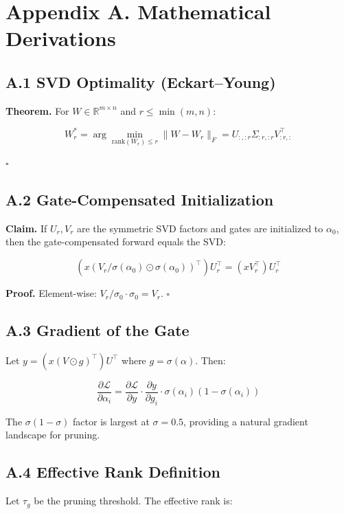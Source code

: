 
\section{Appendix A. Mathematical Derivations}

\subsection{A.1 SVD Optimality (Eckart--Young)}

\textbf{Theorem.} For $W \in \mathbb{R}^{m \times n}$ and $r \leq \min(m, n)$:

\[
W_r^* = \arg\min_{\text{rank}(W_r) \leq r} \|W - W_r\|_F = U_{:, :r} \Sigma_{:r, :r} V_{:r, :}^\top
\tag{A.1}
\]

$\square$

\subsection{A.2 Gate-Compensated Initialization}

\textbf{Claim.} If $U_r, V_r$ are the symmetric SVD factors and gates are 
initialized to $\alpha_0$, then the gate-compensated forward equals the SVD:

\[
(x (V_r / \sigma(\alpha_0) \odot \sigma(\alpha_0))^\top) U_r^\top = (x V_r^\top) U_r^\top
\tag{A.2}
\]

\textbf{Proof.} Element-wise: $V_r / \sigma_0 \cdot \sigma_0 = V_r$. $\square$

\subsection{A.3 Gradient of the Gate}

Let $y = (x (V \odot g)^\top) U^\top$ where $g = \sigma(\alpha)$. Then:

\[
\frac{\partial \mathcal{L}}{\partial \alpha_i}
= \frac{\partial \mathcal{L}}{\partial y} \cdot \frac{\partial y}{\partial g_i} \cdot \sigma(\alpha_i)(1 - \sigma(\alpha_i))
\tag{A.3}
\]

The $\sigma(1-\sigma)$ factor is largest at $\sigma = 0.5$, providing a 
natural gradient landscape for pruning.

\subsection{A.4 Effective Rank Definition}

Let $\tau_g$ be the pruning threshold. The effective rank is:

